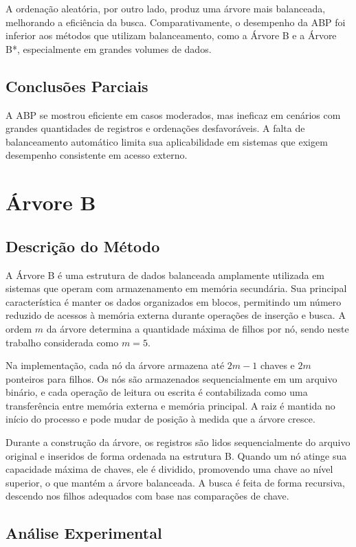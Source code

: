\documentclass[12pt,a4paper,brazil]{article}
\begin{document}
A ordenação aleatória, por outro lado, produz uma árvore mais balanceada, melhorando a eficiência da busca. Comparativamente, o desempenho da ABP foi inferior aos métodos que utilizam balanceamento, como a Árvore B e a Árvore B*, especialmente em grandes volumes de dados.

\subsection{Conclusões Parciais}

A ABP se mostrou eficiente em casos moderados, mas ineficaz em cenários com grandes quantidades de registros e ordenações desfavoráveis. A falta de balanceamento automático limita sua aplicabilidade em sistemas que exigem desempenho consistente em acesso externo.

\section{Árvore B}

\subsection{Descrição do Método}

A Árvore B é uma estrutura de dados balanceada amplamente utilizada em sistemas que operam com armazenamento em memória secundária. Sua principal característica é manter os dados organizados em blocos, permitindo um número reduzido de acessos à memória externa durante operações de inserção e busca. A ordem $m$ da árvore determina a quantidade máxima de filhos por nó, sendo neste trabalho considerada como $m=5$.

Na implementação, cada nó da árvore armazena até $2m - 1$ chaves e $2m$ ponteiros para filhos. Os nós são armazenados sequencialmente em um arquivo binário, e cada operação de leitura ou escrita é contabilizada como uma transferência entre memória externa e memória principal. A raiz é mantida no início do processo e pode mudar de posição à medida que a árvore cresce.

Durante a construção da árvore, os registros são lidos sequencialmente do arquivo original e inseridos de forma ordenada na estrutura B. Quando um nó atinge sua capacidade máxima de chaves, ele é dividido, promovendo uma chave ao nível superior, o que mantém a árvore balanceada. A busca é feita de forma recursiva, descendo nos filhos adequados com base nas comparações de chave.

\subsection{Análise Experimental}
\end{document}
